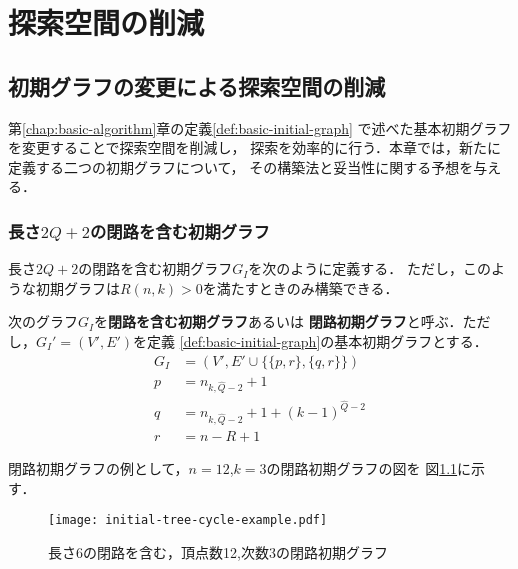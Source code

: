 
\chapter{探索空間の削減}
\label{chap:reduction}

\section{初期グラフの変更による探索空間の削減}
\label{sect:reduce-by-initial-graph}

第\ref{chap:basic-algorithm}章の定義\ref{def:basic-initial-graph}
で述べた基本初期グラフを変更することで探索空間を削減し，
探索を効率的に行う．本章では，新たに定義する二つの初期グラフについて，
その構築法と妥当性に関する予想を与える．

\subsection{長さ$2Q+2$の閉路を含む初期グラフ}
\label{subsect:initial-graph-cycle}
長さ$2Q+2$の閉路を含む初期グラフ$G_I$を次のように定義する．
ただし，このような初期グラフは$R(n,k)>0$を満たすときのみ構築できる．

\begin{definition}[長さ$2Q+2$の閉路を含む初期グラフ]\rm
  \label{def:cycle-initial-graph}
  次のグラフ$G_I$を\textbf{閉路を含む初期グラフ}あるいは
  \textbf{閉路初期グラフ}と呼ぶ．ただし，$G_I'=(V',E')$を定義
  \ref{def:basic-initial-graph}の基本初期グラフとする．
  \begin{equation}
    \begin{aligned}
      G_I&=(V',E'\cup\{\{p,r\},\{q,r\}\}) \\
      p&=n_{k,\hat{Q}-2}+1 \\
      q&=n_{k,\hat{Q}-2}+1+(k-1)^{\hat{Q}-2} \\
      r&=n-R+1
    \end{aligned}
  \end{equation}
\end{definition}

閉路初期グラフの例として，$n=12$,$k=3$の閉路初期グラフの図を
図\ref{fig:initial-graph-cycle-example}に示す．

\begin{figure}
  \centering
  \texttt{[image: initial-tree-cycle-example.pdf]}
  \caption{長さ6の閉路を含む，頂点数12,次数3の閉路初期グラフ}
  \label{fig:initial-graph-cycle-example}
\end{figure}


